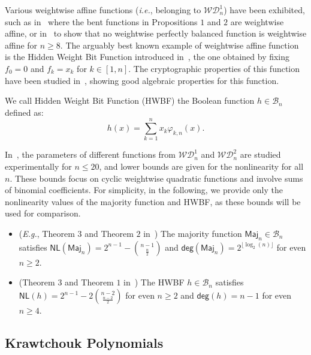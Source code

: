 \documentclass[runningheads,orivec]{llncs}
\newcommand{\BN}{\mathcal{B}_n}
\newcommand{\degg}{\mathsf{deg}}
\newcommand{\hwbf}{\textsf{HWBF}}
\newcommand{\ie}{\textit{i.e.}}
\newcommand{\NL}{\mathsf{NL}}
\newcommand{\phikn}[2]{\varphi_{#1,#2}}
\newcommand{\WD}[2]{\mathcal{WD}^{#1}_{#2}}
\let\leq=\leqslant
\let\geq=\geqslant
\begin{document}
    Various weightwise affine functions (\ie, belonging to $\WD{1}{n}$) have been exhibited, such as in~\cite{TOSC:CarMeaRot17} where the bent functions in Propositions $1$ and $2$ are weightwise affine, or in~\cite{DAM:GinMea22} to show that no weightwise perfectly balanced function is weightwise affine for $n\geq 8$. The arguably best known example of weightwise affine function is the Hidden Weight Bit Function introduced in~\cite{IEEE:Bryant91}, the one obtained by fixing $f_0=0$ and $f_k=x_k$ for $k \in [1,n]$. The cryptographic properties of this function have been studied in~\cite{DAM:WCST14}, showing good algebraic properties for this function.
    
    \begin{definition}\label{def:hwbf}
        We call Hidden Weight Bit Function (\hwbf{}) the Boolean function $h\in\BN$ defined as:
    	\[
    		h(x)=\sum_{k=1}^{n}x_k\phikn{k}{n}(x).
    	\]
    \end{definition}
    
    In~\cite{DAM:MeaOza24}, the parameters of different functions from $\WD{1}{n}$ and $\WD{2}{n}$ are studied experimentally for $n\leq 20$, and lower bounds are given for the nonlinearity for all $n$. These bounds focus on cyclic weightwise quadratic functions and involve sums of binomial coefficients. For simplicity, in the following, we provide only the nonlinearity values of the majority function and \hwbf{}, as these bounds will be used for comparison.
    
    \begin{property}\label{property:wwd1}\mbox{}
    	\begin{itemize}
    		\item (\textit{E.g.}, Theorem $3$ and Theorem $2$ in~\cite{DCC:DalMaiSar06}) The majority function $\mathsf{Maj}_n\in\BN$ satisfies $\NL(\mathsf{Maj}_n)=2^{n-1}-\binom{n-1}{\frac n2}$ and $\degg(\mathsf{Maj}_n)=2^{\lfloor\log_2(n)\rfloor}$ for even $n\geq 2$.
    		\item (Theorem $3$ and Theorem $1$ in~\cite{DAM:WCST14}) The \hwbf{} $h\in\BN$ satisfies $\NL(h)=2^{n-1}-2\binom{n-2}{\frac{n-2}{2}}$ for even $n\geq 2$ and $\degg(h)=n-1$ for even $n\geq 4$.
    	\end{itemize}
    \end{property}

    \subsection{Krawtchouk Polynomials}
\end{document}
